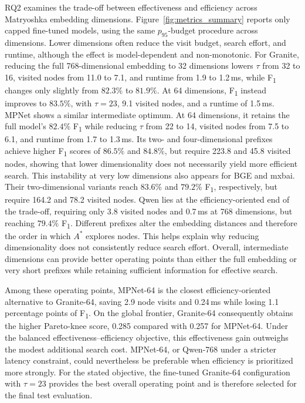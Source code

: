 RQ2 examines the trade-off between effectiveness and efficiency across Matryoshka embedding dimensions. Figure~\ref{fig:metrics_summary} reports only capped fine-tuned models, using the same $p_{95}$-budget procedure across dimensions. Lower dimensions often reduce the visit budget, search effort, and runtime, although the effect is model-dependent and non-monotonic. For Granite, reducing the full 768-dimensional embedding to 32 dimensions lowers $\tau$ from 32 to 16, visited nodes from 11.0 to 7.1, and runtime from 1.9 to 1.2\,ms, while F\textsubscript{1} changes only slightly from \(82.3\%\) to \(81.9\%\). At 64 dimensions, F\textsubscript{1} instead improves to \(83.5\%\), with $\tau=23$, 9.1 visited nodes, and a runtime of 1.5\,ms. MPNet shows a similar intermediate optimum. At 64 dimensions, it retains the full model's \(82.4\%\) F\textsubscript{1} while reducing $\tau$ from 22 to 14, visited nodes from 7.5 to 6.1, and runtime from 1.7 to 1.3\,ms. Its two- and four-dimensional prefixes achieve higher F\textsubscript{1} scores of \(86.5\%\) and \(84.8\%\), but require 223.8 and 45.8 visited nodes, showing that lower dimensionality does not necessarily yield more efficient search. This instability at very low dimensions also appears for BGE and mxbai. Their two-dimensional variants reach \(83.6\%\) and \(79.2\%\) F\textsubscript{1}, respectively, but require 164.2 and 78.2 visited nodes. Qwen lies at the efficiency-oriented end of the trade-off, requiring only 3.8 visited nodes and 0.7\,ms at 768 dimensions, but reaching \(79.4\%\) F\textsubscript{1}. Different prefixes alter the embedding distances and therefore the order in which $A^*$ explores nodes. This helps explain why reducing dimensionality does not consistently reduce search effort. Overall, intermediate dimensions can provide better operating points than either the full embedding or very short prefixes while retaining sufficient information for effective search.

Among these operating points, MPNet-64 is the closest efficiency-oriented alternative to Granite-64, saving 2.9 node visits and 0.24\,ms while losing 1.1 percentage points of F\textsubscript{1}. On the global frontier, Granite-64 consequently obtains the higher Pareto-knee score, 0.285 compared with 0.257 for MPNet-64. Under the balanced effectiveness--efficiency objective, this effectiveness gain outweighs the modest additional search cost. MPNet-64, or Qwen-768 under a stricter latency constraint, could nevertheless be preferable when efficiency is prioritized more strongly. For the stated objective, the fine-tuned Granite-64 configuration with $\tau=23$ provides the best overall operating point and is therefore selected for the final test evaluation.

